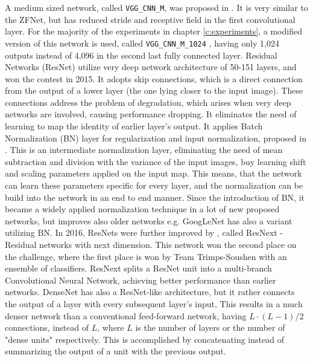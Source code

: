 \bigbreak
A medium sized network, called \texttt{VGG\_CNN\_M}, was proposed in \cite{Chatfield14}. It is very similar to the ZFNet, but has reduced stride and receptive field in the first convolutional layer. For the majority of the experiments in chapter \ref{c:experiments}, a modified version of this network is used, called \texttt{VGG\_CNN\_M\_1024} \cite{Chatfield14}, having only 1,024 outputs instead of 4,096 in the second last fully connected layer.
\bigbreak
Residual Networks (ResNet) \cite{DBLP:journals/corr/HeZRS15} utilize very deep network architecture of 50-151 layers, and won the contest in 2015. It adopts skip connections, which is a direct connection from the output of a lower layer (the one lying closer to the input image). These connections address the problem of degradation, which arises when very deep networks are involved, causing performance dropping. It eliminates the need of learning to map the identity of earlier layer's output. It applies Batch Normalization (BN) layer for regularization and input normalization, proposed in \cite{DBLP:journals/corr/IoffeS15}. This is an intermediate normalization layer, eliminating the need of mean subtraction and division with the variance of the input images, buy learning shift and scaling parameters applied on the input map. This means, that the network can learn these parameters specific for every layer, and the normalization can be build into the network in an end to end manner. Since the introduction of BN, it became a widely applied normalization technique in a lot of new proposed networks, but improves also older networks e.g. GoogLeNet has also a variant utilizing BN.
\bigbreak
In 2016, ResNets were further improved by \cite{DBLP:journals/corr/XieGDTH16}, called ResNext - Residual networks with next dimension. This network won the second place on the challenge, where the first place is won by Team Trimps-Soushen \cite{ILSVRC16} with an ensemble of classifiers. ResNext splits a ResNet unit into a multi-branch Convolutional Neural Network, achieving better performance than earlier networks.
\bigbreak
DenseNet \cite{DBLP:journals/corr/HuangLW16a} has also a ResNet-like architecture, but it rather connects the output of a layer with every subsequent layer's input, This results in a much denser network than a conventional feed-forward network, having $L\cdot(L-1)/2$ connections, instead of $L$, where $L$ is the number of layers or the number of "dense units" respectively. This is accomplished by concatenating instead of summarizing the output of a unit with the previous output.
\bigbreak
